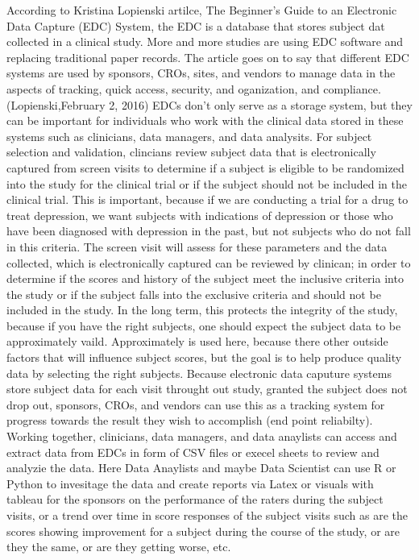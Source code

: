 \documentclass[sigconf]{acmart}
\begin{document}
{According to Kristina Lopienski artilce, The Beginner’s Guide to an Electronic Data Capture (EDC) System, the EDC is a database that stores subject dat collected in a clinical study. 
More and more studies are using EDC software and replacing traditional paper records. 
The article goes on to say that different EDC systems are used by sponsors, CROs, sites, and vendors to manage data in the aspects of tracking, quick access, security, and oganization, and compliance. (Lopienski,February 2, 2016)
EDCs don't only serve as a storage system, but they can be important for individuals who work with the clinical data stored in these systems such as clinicians, data managers, and data analysits. For subject selection and validation, clincians review subject data that is electronically captured from screen visits to determine if a subject is eligible to be randomized into the study for the clinical trial or if the subject should not be included in the clinical trial. 
This is important, because if we are conducting a trial for a drug to treat depression, we want subjects with indications of depression or those who have been diagnosed with depression in the past, but not subjects who do not fall in this criteria. 
The screen visit will assess for these parameters and the data collected, which is electronically captured can be reviewed by clinican;
in order to determine if the scores and history of the subject meet the inclusive criteria into the study or if the subject falls into the exclusive criteria and should not be included in the study. In the long term, this protects the integrity of the study, because if you have the right subjects, one should expect the subject data to be approximately vaild. Approximately is used here, because there other outside factors that will influence subject scores, but the goal is to help produce quality data by selecting the right subjects.
Because electronic data caputure systems store subject data for each visit throught out study, granted the subject does not drop out, sponsors, CROs, and vendors can use this as a tracking system for progress towards the result they wish to accomplish (end point reliabilty). 
Working together, clinicians, data managers, and data anaylists can access and extract data from EDCs in form of CSV files or execel sheets to review and analyzie the data.
Here Data Anaylists and maybe Data Scientist can use R or Python to invesitage the data and create reports via Latex or visuals with tableau for the sponsors on the performance of the raters during the subject visits, or a trend over time in score responses of the subject visits such as are the scores showing improvement for a subject during the course of the study, or are they the same, or are they getting worse, etc. 

}
\end{document}
